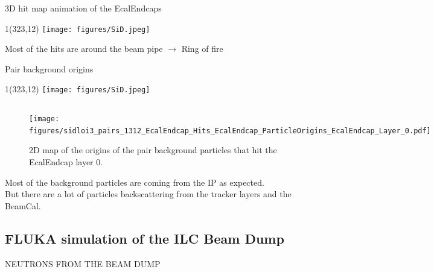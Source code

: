 \documentclass[xcolor={dvipsnames}]{beamer}
\newcommand{\sidlogo}{
  \setlength{\TPHorizModule}{1pt}
  \setlength{\TPVertModule}{1pt}
  \begin{textblock}{1}(323,12)
   \texttt{[image: figures/SiD.jpeg]}
  \end{textblock}
  }
\begin{document}
\begin{frame}[t]{3D hit map animation of the EcalEndcaps}
\sidlogo
\begin{center}
\end{center}
Most of the hits are around the beam pipe $\rightarrow$ Ring of fire
\end{frame}

\begin{frame}{Pair background origins}
\sidlogo
  \begin{figure}
 	\begin{columns}
        \begin{flushright}
        \texttt{[image: figures/sidloi3\_pairs\_1312\_EcalEndcap\_Hits\_EcalEndcap\_ParticleOrigins\_EcalEndcap\_Layer\_0.pdf]}
        \end{flushright}
        \begin{flushleft}
	\caption{\small 2D map of the origins of the pair background particles that hit the EcalEndcap layer 0.}
        \end{flushleft}
      \end{columns}
\end{figure}

Most of the background particles are coming from the IP as expected.\\
But there are a lot of particles backscattering from the tracker layers and the BeamCal.
\end{frame}

\subsection{FLUKA simulation of the ILC Beam Dump}
\begin{frame}
 \begin{center}
  \alert{\MakeUppercase{Neutrons from the beam dump}}
 \end{center}
\end{frame}
\end{document}
